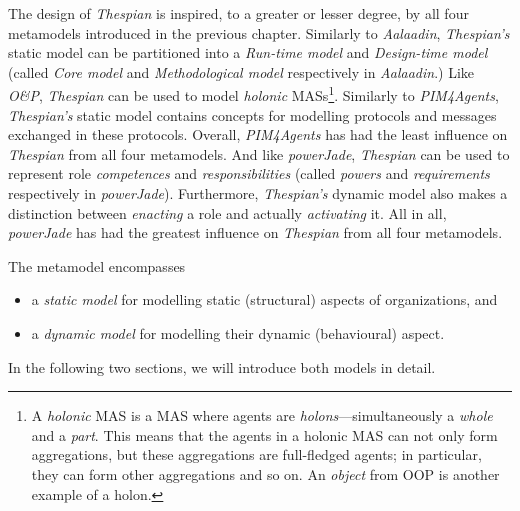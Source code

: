 The design of \textit{Thespian} is inspired, to a greater or lesser degree, by all four metamodels introduced in the previous chapter.
Similarly to \textit{Aalaadin}, \textit{Thespian's} static model can be partitioned into a \textit{Run-time model} and \textit{Design-time model} (called \textit{Core model} and \textit{Methodological model} respectively in \textit{Aalaadin}.)
Like \textit{O\&P}, \textit{Thespian} can be used to model \textit{holonic} MASs\footnote{A \textit{holonic} MAS is a MAS where agents are \textit{holons}---simultaneously a \textit{whole} and a \textit{part}. This means that the agents in a holonic MAS can not only form aggregations, but these aggregations are full-fledged agents; in particular, they can form other aggregations and so on. An \textit{object} from OOP is another example of a holon.}.
Similarly to \textit{PIM4Agents}, \textit{Thespian's} static model contains concepts for modelling protocols and messages exchanged in these protocols. Overall, \textit{PIM4Agents} has had the least influence on \textit{Thespian} from all four metamodels.
And like \textit{powerJade}, \textit{Thespian} can be used to represent role \textit{competences} and \textit{responsibilities} (called \textit{powers} and \textit{requirements} respectively in \textit{powerJade}).
Furthermore, \textit{Thespian's} dynamic model also makes a distinction between \textit{enacting} a role and actually \textit{activating} it.
All in all, \textit{powerJade} has had the greatest influence on \textit{Thespian} from all four metamodels.

The metamodel encompasses
\begin{itemize}
	\item a \textit{static model} for modelling static (structural) aspects of organizations, and
	\item a \textit{dynamic model} for modelling their dynamic (behavioural) aspect.
\end{itemize}
In the following two sections, we will introduce both models in detail.



